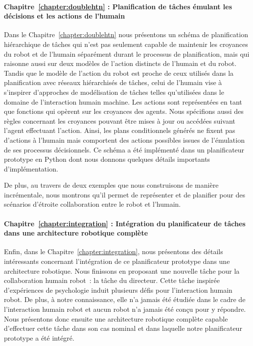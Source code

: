 \paragraph{Chapitre~\ref{chapter:doublehtn} : Planification de tâches émulant les décisions et les actions de l'humain}
Dans le Chapitre~\ref{chapter:doublehtn} nous présentons un schéma de planification hiérarchique de tâches qui n'est pas seulement capable de maintenir les croyances du robot et de l'humain séparément durant le processus de planification, mais qui raisonne aussi sur deux modèles de l'action distincts de l'humain et du robot. Tandis que le modèle de l'action du robot est proche de ceux utilisés dans la planification avec réseaux hiérarchisés de tâches, celui de l'humain vise à s'inspirer d'approches de modélisation de tâches telles qu'utilisées dans le domaine de l'interaction humain machine. Les actions sont représentées en tant que fonctions qui opèrent sur les croyances des agents. Nous spécifions aussi des règles concernant les croyances pouvant être mises à jour ou accédées suivant l'agent effectuant l'action. Ainsi, les plans conditionnels générés ne fixent pas d'actions à l'humain mais comportent des actions possibles issues de l'émulation de ses processus décisionnels. Ce schéma a été implémenté dans un planificateur prototype en Python dont nous donnons quelques détails importants d'implémentation.

De plus, au travers de deux exemples que nous construisons de manière incrémentale, nous montrons qu'il permet de représenter et de planifier pour des scénarios d'étroite collaboration entre le robot et l'humain. 

\paragraph{Chapitre~\ref{chapter:integration} : Intégration du planificateur de tâches dans une architecture robotique complète}
Enfin, dans le Chapitre~\ref{chapter:integration}, nous présentons des détails intéressants concernant l'intégration de ce planificateur prototype dans une architecture robotique. Nous finissons en proposant une nouvelle tâche pour la collaboration humain robot~: la tâche du directeur. Cette tâche inspirée d'expériences de psychologie induit plusieurs défis pour l'interaction humain robot. De plus, à notre connaissance, elle n'a jamais été étudiée dans le cadre de l'interaction humain robot et aucun robot n'a jamais été conçu pour y répondre. Nous présentons donc ensuite une architecture robotique complète capable d'effectuer cette tâche dans son cas nominal et dans laquelle notre planificateur prototype a été intégré.

